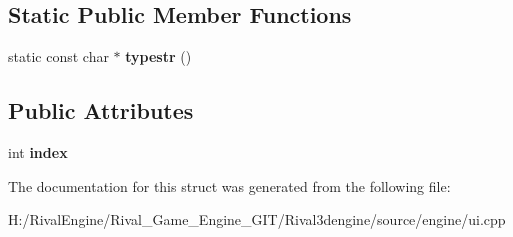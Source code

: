 \subsection*{Static Public Member Functions}
\begin{DoxyCompactItemize}
\item 
\mbox{\label{struct_u_i_1_1_slot_viewer_ac8be645630793a82cc359f8e15e08a74}} 
static const char $\ast$ {\bfseries typestr} ()
\end{DoxyCompactItemize}
\subsection*{Public Attributes}
\begin{DoxyCompactItemize}
\item 
\mbox{\label{struct_u_i_1_1_slot_viewer_aff94d1c8ad552d8b7597c0d51e049764}} 
int {\bfseries index}
\end{DoxyCompactItemize}


The documentation for this struct was generated from the following file\+:\begin{DoxyCompactItemize}
\item 
H\+:/\+Rival\+Engine/\+Rival\+\_\+\+Game\+\_\+\+Engine\+\_\+\+G\+I\+T/\+Rival3dengine/source/engine/ui.\+cpp\end{DoxyCompactItemize}
